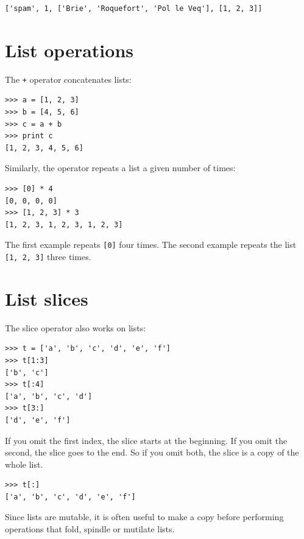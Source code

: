 \documentclass[10pt]{book}
\begin{document}

\beforeverb
\begin{verbatim}
['spam', 1, ['Brie', 'Roquefort', 'Pol le Veq'], [1, 2, 3]]
\end{verbatim}
\afterverb



\section{List operations}

The {\tt +} operator concatenates lists:


\beforeverb
\begin{verbatim}
>>> a = [1, 2, 3]
>>> b = [4, 5, 6]
>>> c = a + b
>>> print c
[1, 2, 3, 4, 5, 6]
\end{verbatim}
\afterverb
%
Similarly, the {\tt *} operator repeats a list a given number of times:


\beforeverb
\begin{verbatim}
>>> [0] * 4
[0, 0, 0, 0]
>>> [1, 2, 3] * 3
[1, 2, 3, 1, 2, 3, 1, 2, 3]
\end{verbatim}
\afterverb
%
The first example repeats {\tt [0]} four times.  The second example
repeats the list {\tt [1, 2, 3]} three times.


\section{List slices}


The slice operator also works on lists:

\beforeverb
\begin{verbatim}
>>> t = ['a', 'b', 'c', 'd', 'e', 'f']
>>> t[1:3]
['b', 'c']
>>> t[:4]
['a', 'b', 'c', 'd']
>>> t[3:]
['d', 'e', 'f']
\end{verbatim}
\afterverb
%
If you omit the first index, the slice starts at the beginning.
If you omit the second, the slice goes to the end.  So if you
omit both, the slice is a copy of the whole list.


\beforeverb
\begin{verbatim}
>>> t[:]
['a', 'b', 'c', 'd', 'e', 'f']
\end{verbatim}
\afterverb
%
Since lists are mutable, it is often useful to make a copy
before performing operations that fold, spindle or mutilate
lists.
\end{document}
